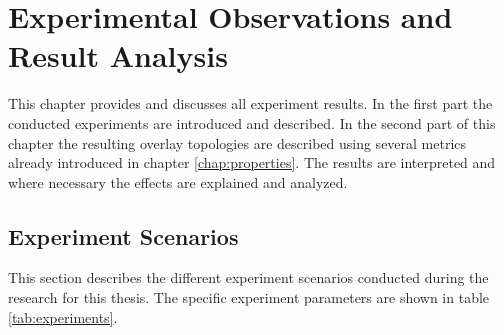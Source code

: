 \chapter{Experimental Observations and Result Analysis} 
\label{chap:results}

This chapter provides and discusses all experiment results. In the first part
the conducted experiments are introduced and described. In the second part of
this chapter the resulting overlay topologies are described using several
metrics already introduced in chapter \ref{chap:properties}. The results are
interpreted and where necessary the effects are explained and analyzed.

\section{Experiment Scenarios}
This section describes the different experiment scenarios conducted during the
research for this thesis. The specific experiment parameters are shown in table
\ref{tab:experiments}.
